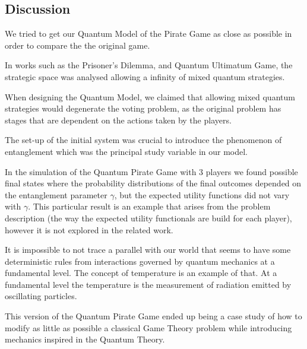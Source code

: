 \subsection{Discussion}
\label{subsec:3playergame:discution}

We tried to get our Quantum Model of the Pirate Game as close as possible in order to compare the the original game. 

In works such as the Prisoner's Dilemma\cite{Letters2002}\cite{Eisert2008}, and Quantum Ultimatum Game\cite{Fra2011}, the strategic space was analysed allowing a infinity of mixed quantum strategies.

When designing the Quantum Model, we claimed that allowing mixed quantum strategies would degenerate the voting problem, as the original problem has stages that are dependent on the actions taken by the players.

The set-up of the initial system was crucial to introduce the phenomenon of entanglement which was the principal study variable in our model.

In the simulation of the Quantum Pirate Game with $3$ players we found possible final states where the probability distributions of the final outcomes depended on the entanglement parameter $\gamma$, but the expected utility functions did not vary with $\gamma$. This particular result is an example that arises from the problem description (the way the expected utility functionals are build for each player), however it is not explored in the related work. 

It is impossible to not trace a parallel with our world that seems to have some deterministic rules from interactions governed by quantum mechanics at a fundamental level. The concept of temperature is an example of that. At a fundamental level the temperature is the measurement of radiation emitted by oscillating particles. 


This version of the Quantum Pirate Game ended up being a case study of how to modify as little as possible a classical Game Theory problem while introducing mechanics inspired in the Quantum Theory. 

 






